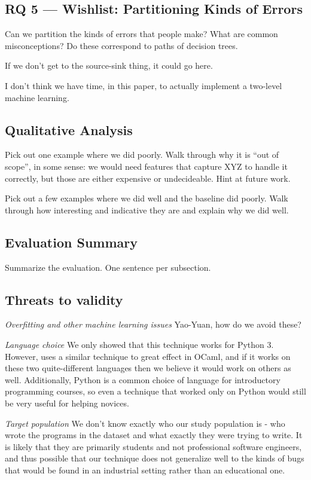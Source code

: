 \documentclass[conference]{IEEEtran}
\begin{document}
\subsection{RQ 5 --- Wishlist: Partitioning Kinds of Errors}

Can we partition the kinds of errors that people make? What are common
misconceptions? Do these correspond to paths of decision trees.

If we don't get to the source-sink thing, it could go here.

I don't think we have time, in this paper, to actually implement a
two-level machine learning.

\subsection{Qualitative Analysis}

Pick out one example where we did poorly. Walk through why it is ``out of
scope'', in some sense: we would need features that capture XYZ to handle
it correctly, but those are either expensive or undecideable. Hint at
future work.

Pick out a few examples where we did well and the baseline did poorly. Walk
through how interesting and indicative they are and explain why we did well.

\subsection{Evaluation Summary}

Summarize the evaluation. One sentence per subsection.

\subsection{Threats to validity}

\emph{Overfitting and other machine learning issues} Yao-Yuan, how do we avoid
these?

\emph{Language choice} We only showed that this technique works for Python 3.
However, \cite{learning-to-blame} uses a similar technique to great effect in
OCaml, and if it works on these two quite-different languages then we believe
it would work on others as well. Additionally, Python is a common choice of
language for introductory programming courses, so even a technique that worked
only on Python would still be very useful for helping novices.

\emph{Target population} We don't know exactly who our study population is -
who wrote the programs in the dataset and what exactly they were trying to write.
It is likely that they are primarily students and not professional software engineers,
and thus possible that our technique does not generalize well to the kinds of
bugs that would be found in an industrial setting rather than an educational one.
\end{document}
